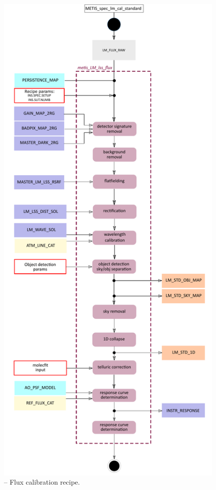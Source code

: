 \begin{figure}[ht]
  \centering
  \includegraphics[width=0.4\textheight]{figures/metis_lm_lss_flux_v0.70.pdf}
  \caption[Recipe: ]{ --
    Flux calibration recipe.}
  \label{Fig:rec_lm_lss_flux}
\end{figure}
